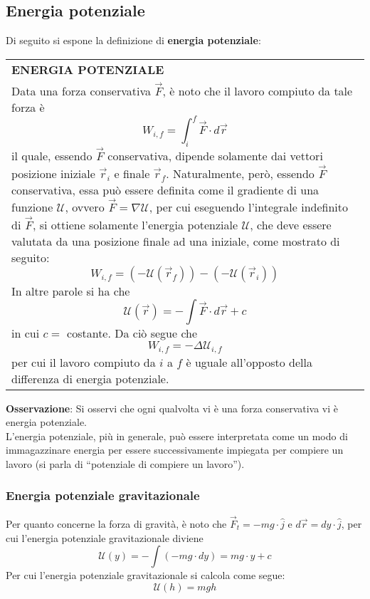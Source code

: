 \documentclass[a4paper]{extarticle}
\newcommand{\quotes}[1]{``#1''}
\renewcommand\arraystretch{}
\begin{document}
\vspace{1em}
\subsection{Energia potenziale}
Di seguito si espone la definizione di \textbf{energia potenziale}:

\vspace{1em}
\setlength{\tabcolsep}{14pt}
\renewcommand{\arraystretch}{2}
\noindent
\begin{tabularx}{\textwidth}{@{}|P|@{}}
    \hline
    {\textbf{ENERGIA POTENZIALE}}\\
    \parbox{\linewidth}{Data una forza conservativa $\vec F$, è noto che il lavoro compiuto da tale forza è
    \[W_{i,f}=\int_{i}^f \vec F \cdot d \vec r\]
    il quale, essendo $\vec F$ conservativa, dipende solamente dai vettori posizione iniziale $\vec r_i$ e finale $\vec r_f$. Naturalmente, però, essendo $\vec F$ conservativa, essa può essere definita come il gradiente di una funzione $\mathcal{U}$, ovvero $\vec F = \nabla \mathcal{U}$, per cui eseguendo l'integrale indefinito di $\vec F$, si ottiene solamente l'energia potenziale $\mathcal{U}$, che deve essere valutata da una posizione finale ad una iniziale, come mostrato di seguito:
    \[W_{i,f} = \left(-\mathcal{U}(\vec r_f)\right) - \left(-\mathcal{U}(\vec r_i)\right)\]
    In altre parole si ha che
    \[\boxed{\mathcal{U}(\vec r) = - \int \vec F \cdot d \vec r + c}\]
    in cui $c=$ costante. Da ciò segue che
    \[\boxed{W_{i,f}=-\Delta \mathcal{U}_{i,f}}\]
    per cui il lavoro compiuto da $i$ a $f$ è uguale all'opposto della differenza di energia potenziale.\vspace{3mm}}\\
    \hline
\end{tabularx}

\vspace{2em}
\noindent
\textbf{Osservazione}: Si osservi che ogni qualvolta vi è una forza conservativa vi è energia potenziale.\\
L'energia potenziale, più in generale, può essere interpretata come un modo di immagazzinare energia per essere successivamente impiegata per compiere un lavoro (si parla di \quotes{potenziale di compiere un lavoro}).

\vspace{1em}
\subsubsection{Energia potenziale gravitazionale}
Per quanto concerne la forza di gravità, è noto che $\vec F_t = - mg \cdot \hat{j}$ e $d \vec r = dy \cdot \hat{j}$, per cui l'energia potenziale gravitazionale diviene
\[\mathcal{U}(y)=-\int(-mg \cdot dy) = mg \cdot y + c\]
Per cui l'energia potenziale gravitazionale si calcola come segue:
\[\boxed{\mathcal{U}(h)=mgh}\]
\end{document}
